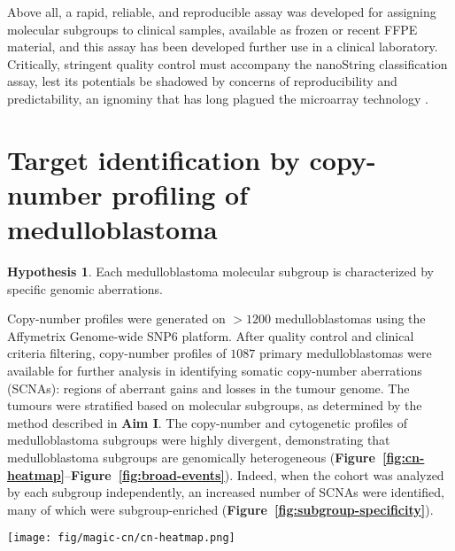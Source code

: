\documentclass[11pt,letterpaper]{article}
\theoremstyle{definition}
\newtheorem*{hypothesis}{Hypothesis}
\newcommand{\emphlab}[1]{\textbf{\textsf{#1}}}
\newcommand{\citefig}[1]{\emphlab{Figure~\ref{fig:#1}}}
\begin{document}
Above all, a rapid, reliable, and reproducible assay was developed for assigning molecular subgroups to clinical samples, available as frozen or recent FFPE material, and this assay has been developed further use in a clinical laboratory. Critically, stringent quality control must accompany the nanoString classification assay, lest its potentials be shadowed by concerns of reproducibility and predictability, an ignominy that has long plagued the microarray technology .


\clearpage


\section{Target identification by copy-number profiling of medulloblastoma}

\begin{hypothesis}
Each medulloblastoma molecular subgroup is characterized by specific genomic aberrations.
\end{hypothesis}

Copy-number profiles were generated on $> 1200$ medulloblastomas using the Affymetrix Genome-wide SNP6 platform. After quality control and clinical criteria filtering, copy-number profiles of $1087$ primary medulloblastomas were available for further analysis in identifying somatic copy-number aberrations (SCNAs): regions of aberrant gains and losses in the tumour genome. The tumours were stratified based on molecular subgroups, as determined by the method described in \textbf{Aim I}. The copy-number and cytogenetic profiles of medulloblastoma subgroups were highly divergent, demonstrating that medulloblastoma subgroups are genomically heterogeneous (\citefig{cn-heatmap}--\citefig{broad-events}). Indeed, when the cohort was analyzed by each subgroup independently, an increased number of SCNAs were identified, many of which were subgroup-enriched (\citefig{subgroup-specificity}).

\begin{SCfigure}[5][t]
	\centering
	\texttt{[image: fig/magic-cn/cn-heatmap.png]}
	\caption[Genome-wide copy-number profile of medulloblastoma subgroups]
	{
	Genome-wide copy-number profile of medulloblastoma subgroups.
	Copy-number profiling was performed on 1087 non-overlapping primary medulloblastomas. Shown is a copy number heatmap for 827 cases classified according to medulloblastoma subgroup based on matched gene expression data.  Amplifications are shown in red and deletions in blue.
	}
	\label{fig:cn-heatmap}
\end{SCfigure}
\end{document}
